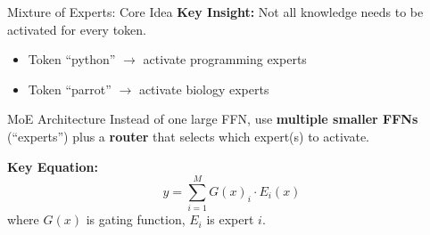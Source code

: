 \documentclass[aspectratio=169,10pt]{beamer}
\begin{document}
\begin{frame}{Mixture of Experts: Core Idea}
    \textbf{Key Insight:} Not all knowledge needs to be activated for every token.

    \vspace{0.3cm}
    \begin{itemize}
        \item Token ``python'' $\to$ activate programming experts
        \item Token ``parrot'' $\to$ activate biology experts
    \end{itemize}

    \vspace{0.3cm}
    \begin{block}{MoE Architecture}
        Instead of one large FFN, use \textbf{multiple smaller FFNs} (``experts'') plus a \textbf{router} that selects which expert(s) to activate.
    \end{block}

    \vspace{0.3cm}
    \textbf{Key Equation:}
    $$y = \sum_{i=1}^{M} G(x)_i \cdot E_i(x)$$
    where $G(x)$ is gating function, $E_i$ is expert $i$.


\end{frame}
\end{document}
